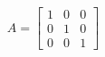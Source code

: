 \documentclass[preview]{standalone}
\begin{document}
\begin{align*}
A = \begin{bmatrix} 1 & 0 & 0 \\ 0 & 1 & 0 \\ 0 & 0 & 1 \end{bmatrix}
\end{align*}
\end{document}
